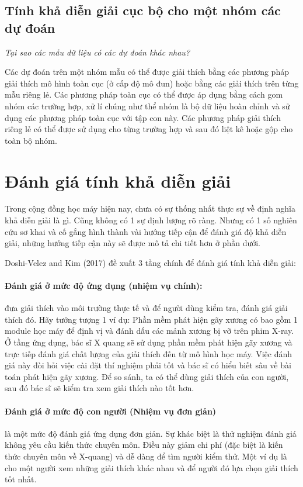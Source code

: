 \subsection{Tính khả diễn giải cục bộ cho một nhóm các dự đoán}
\textit{Tại sao các mẫu dữ liệu có các dự đoán khác nhau?}

Các dự đoán trên một nhóm mẫu có thể được giải thích bằng các phương pháp giải thích mô hình toàn cục (ở cấp độ mô đun) hoặc bằng các giải thích trên từng mẫu riêng lẻ. Các phương pháp toàn cục có thể được áp dụng bằng cách gom nhóm các trường hợp, xử lí chúng như thể nhóm là bộ dữ liệu hoàn chỉnh và sử dụng các phương pháp toàn cục với tập con này. Các phương pháp giải thích riêng lẻ có thể được sử dụng cho từng trường hợp và sau đó liệt kê hoặc gộp cho toàn bộ nhóm.

\clearpage

\section{Đánh giá tính khả diễn giải}

Trong cộng đồng học máy hiện nay, chưa có sự thống nhất thực sự về định nghĩa khả diễn giải là gì. Cũng không có 1 sự định lượng rõ ràng. Nhưng có 1 số nghiên cứu sơ khai và cố gắng hình thành vài hướng tiếp cận để đánh giá độ khả diễn giải, những hướng tiếp cận này sẽ được mô tả chi tiết hơn ở phần dưới.

Doshi-Velez and Kim (2017) đề xuất 3 tầng chính để đánh giá tính khả diễn giải:

\paragraph{Đánh giá ở mức độ ứng dụng (nhiệm vụ chính):} đưa giải thích vào môi trường thực tế và để người dùng kiểm tra, đánh giá giải thích đó. Hãy tưởng tượng 1 ví dụ: Phần mềm phát hiện gãy xương có bao gồm 1 module học máy để định vị và đánh dấu các mảnh xương bị vỡ trên phim X-ray. Ở tầng ứng dụng, bác sĩ X quang sẽ sử dụng phần mềm phát hiện gãy xương và trực tiếp đánh giá chất lượng của giải thích đến từ mô hình học máy. Việc đánh giá này đòi hỏi việc cài đặt thí nghiệm phải tốt và bác sĩ có hiểu biết sâu về bài toán phát hiện gãy xương. Để so sánh, ta có thể dùng giải thích của con người, sau đó bác sĩ sẽ kiểm tra xem giải thích nào tốt hơn.

\paragraph{Đánh giá ở mức độ con người (Nhiệm vụ đơn giản)} là một mức độ đánh giá ứng dụng đơn giản. Sự khác biệt là thử nghiệm đánh giá không yêu cầu kiến thức chuyên môn. Điều này giảm chi phí (đặc biệt là kiến thức chuyên môn về X-quang) và dễ dàng để tìm người kiểm thử. Một ví dụ là cho một người xem những giải thích khác nhau và để người đó lựa chọn giải thích tốt nhất.

